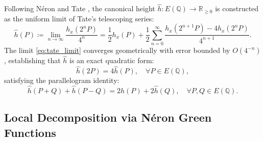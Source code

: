 \documentclass[11pt,reqno]{article}
\theoremstyle{plain}
\theoremstyle{definition}
\begin{document}
Following Néron and Tate \cite{neron_1965, tate_1974}, the canonical height $\hat{h}: E(\mathbb{Q}) \to \mathbb{R}_{\ge 0}$ is constructed as the uniform limit of Tate's telescoping series:
\begin{equation}
    \label{eq:tate_limit}
    \hat{h}(P) \coloneqq \lim_{n \to \infty} \frac{h_x(2^n P)}{4^n} = \frac{1}{2} h_x(P) + \frac{1}{2} \sum_{n=0}^\infty \frac{h_x(2^{n+1} P) - 4 h_x(2^n P)}{4^{n+1}}.
\end{equation}
The limit \eqref{eq:tate_limit} converges geometrically with error bounded by $O(4^{-n})$, establishing that $\hat{h}$ is an exact quadratic form:
\begin{equation}
    \hat{h}(2P) = 4 \hat{h}(P), \quad \forall P \in E(\mathbb{Q}),
\end{equation}
satisfying the parallelogram identity:
\begin{equation}
    \label{eq:parallelogram}
    \hat{h}(P + Q) + \hat{h}(P - Q) = 2 \hat{h}(P) + 2 \hat{h}(Q), \quad \forall P, Q \in E(\mathbb{Q}).
\end{equation}

\subsection{Local Decomposition via Néron Green Functions}
\end{document}
